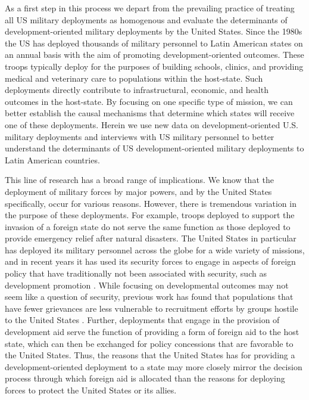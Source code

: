 \documentclass[12pt]{article}
\begin{document}
\begin{doublespace}
As a first step in this process we depart from the prevailing practice of treating all US military deployments as homogenous and evaluate the determinants of development-oriented military deployments by the United States. Since the 1980s the US has deployed thousands of military personnel to Latin American states on an annual basis with the aim of promoting development-oriented outcomes. These troops typically deploy for the purposes of building schools, clinics, and providing medical and veterinary care to populations within the host-state. Such deployments directly contribute to infrastructural, economic, and health outcomes in the host-state. By focusing on one specific type of mission, we can better establish the causal mechanisms that determine which states will receive one of these deployments.  Herein we use new data on development-oriented U.S. military deployments and interviews with US military personnel to better understand the determinants of US development-oriented military deployments to Latin American countries. 

This line of research has a broad range of implications. We know that the deployment of military forces by major powers, and by the United States specifically, occur for various reasons. However, there is tremendous variation in the purpose of these deployments. For example, troops deployed to support the invasion of a foreign state do not serve the same function as those deployed to provide emergency relief after natural disasters. The United States in particular has deployed its military personnel across the globe for a wide variety of missions, and in recent years it has used its security forces to engage in aspects of foreign policy that have traditionally not been associated with security, such as development promotion \cite{howell2009changing,Heinrichetal2016,aning2010security}.  While focusing on developmental outcomes may not seem like a question of security, previous work has found that populations that have fewer grievances are less vulnerable to recruitment efforts by groups hostile to the United States \cite{scott2011sponsoring,young2011can,Heinrichetal2016,de2005quality,finkel2007effects}.  Further, deployments that engage in the provision of development aid serve the function of providing a form of foreign aid to the host state, which can then be exchanged for policy concessions that are favorable to the United States.  Thus, the reasons that the United States has for providing a development-oriented deployment to a state may more closely mirror the decision process through which foreign aid is allocated than the reasons for deploying forces to protect the United States or its allies. 


\end{doublespace}
\end{document}
